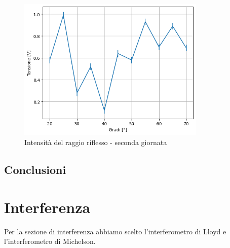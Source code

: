 \documentclass[letterpaper,12pt]{article}
\begin{document}
\begin{figure}[h!]
    \centering
    \includegraphics[width = 0.8\textwidth]{riflesso2.png}
    \caption{Intensità del raggio riflesso - seconda giornata}
    \label{fig:riflesso2}
\end{figure}

\subsection{Conclusioni}

\section{Interferenza}
Per la sezione di interferenza abbiamo scelto l'interferometro di Lloyd e l'interferometro di Michelson.\\
\end{document}
